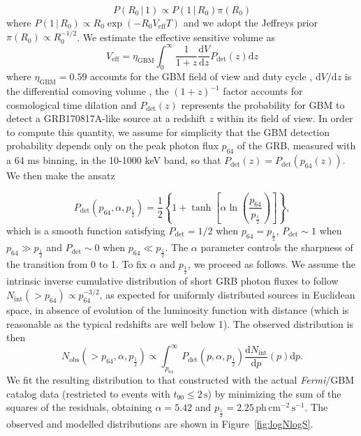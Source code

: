 \documentclass[]{aa}
\newcommand{\resp}[1]{#1}
\begin{document}
\begin{appendix}
\begin{equation}
 P(R_0\,|\,1) \propto P(1\,|\,R_0) \pi(R_0)
 \label{eq:P(R0)}
\end{equation}
where $P(1\,|\,R_0)\propto R_0 \exp(-R_0 V_\mathrm{eff} T)$ and we adopt the Jeffreys prior $\pi(R_0)\propto R_0^{-1/2}$. We estimate the effective sensitive volume as
\begin{equation}
 V_\mathrm{eff} = \eta_\mathrm{GBM}\int_0^{\infty}\frac{1}{1+z}\frac{\mathrm{d}V}{\mathrm{d}z}P_\mathrm{det}(z)\mathrm{d}z
 \label{eq:VeffGBM}
\end{equation}
where $\eta_\mathrm{GBM}=0.59$ accounts for the GBM field of view and duty cycle \citep{Burns2016}, $\mathrm{d}V/\mathrm{d}z$ is the differential comoving volume \citep{Hogg1999}, \resp{the $(1+z)^{-1}$ factor accounts for cosmological time dilation} and $P_\mathrm{det}(z)$ represents the probability for GBM to detect a GRB170817A-like source at a redshift $z$ \resp{within its field of view}. In order to compute this quantity, we assume for simplicity that the GBM detection probability depends only on the peak photon flux $p_{64}$ of the GRB, measured with a 64 ms binning, in the 10-1000 keV band, so that $P_\mathrm{det}(z)=P_\mathrm{det}(p_{64}(z))$. We then make the ansatz

\begin{equation}
 P_\mathrm{det}(p_{64},\alpha,p_{\frac{1}{2}}) = \frac{1}{2}\left\lbrace1 + \tanh\left[\alpha\ln\left(\frac{p_{64}}{p_{\frac{1}{2}}}\right)\right]\right\rbrace,
 \label{eq:pdet_ansatz}
\end{equation}
which is a smooth function satisfying $P_\mathrm{det}=1/2$ when $p_\mathrm{64}= p_{\frac{1}{2}}$,  $P_\mathrm{det}\sim 1$ when $p_\mathrm{64}\gg p_{\frac{1}{2}}$ and $P_\mathrm{det}\sim 0$ when $p_\mathrm{64}\ll p_{\frac{1}{2}}$. The $\alpha$ parameter controls the sharpness of the transition from 0 to 1. To fix  $\alpha$ and $p_\mathrm{\frac{1}{2}}$, we proceed as follows. We assume the intrinsic inverse cumulative distribution of short GRB photon fluxes to follow $N_\mathrm{int}(>p_{64})\propto p_{64}^{-3/2}$, as expected for uniformly distributed sources in Euclidean space, in absence of evolution of the luminosity function with distance (which is reasonable as the typical redshifts are well below 1).  The observed distribution is then 
\begin{equation}
 N_\mathrm{obs}(>p_{64},\alpha,p_{\frac{1}{2}})\propto \int_{p_{64}}^\infty P_\mathrm{det}(p,\alpha,p_{\frac{1}{2}}) \frac{\mathrm{d}N_\mathrm{int}}{\mathrm{d}p}(p) \mathrm{d}p.
 \label{eq:Nobs_model}
\end{equation}
We fit the resulting distribution to that constructed with the actual \textit{Fermi}/GBM catalog data (restricted to events with $t_{90}\leq 2\,\mathrm{s}$) by minimizing the sum of the squares of the residuals, obtaining $\alpha=5.42$ and $p_{\frac{1}{2}}=2.25\,\mathrm{ph\,cm^{-2}\,s^{-1}}$. The observed and modelled distributions are shown in Figure~\ref{fig:logNlogS}.  


\end{appendix}
\end{document}
